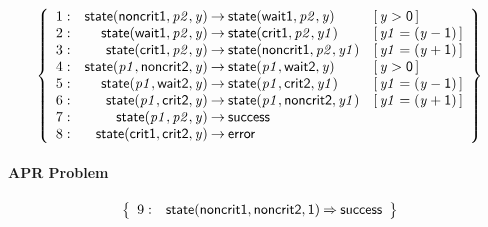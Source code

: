 \documentclass[a4paper]{article}
\newcommand{\symb}[1]{\mathsf{#1}}
\newcommand{\var}[1]{\mathit{#1}}
\newcommand{\Constraint}[1]{[\, #1 \,]}
\begin{document}
\[
\left\{
\begin{array}{rr@{\>}c@{\>}ll}
\mathrm{1} : 
 & \symb{state}(\symb{noncrit1},\var{p2},\var{y})
 & \to 
 & \symb{state}(\symb{wait1},\var{p2},\var{y})
 & \Constraint{\var{y} > \symb{0}}\\

\mathrm{2} : 
 & \symb{state}(\symb{wait1},\var{p2},\var{y})
 & \to 
 & \symb{state}(\symb{crit1},\var{p2},\var{y1})
 & \Constraint{\var{y1} = (\var{y} - \symb{1})}\\

\mathrm{3} : 
 & \symb{state}(\symb{crit1},\var{p2},\var{y})
 & \to 
 & \symb{state}(\symb{noncrit1},\var{p2},\var{y1})
 & \Constraint{\var{y1} = (\var{y} + \symb{1})}\\

\mathrm{4} : 
 & \symb{state}(\var{p1},\symb{noncrit2},\var{y})
 & \to 
 & \symb{state}(\var{p1},\symb{wait2},\var{y})
 & \Constraint{\var{y} > \symb{0}}\\

\mathrm{5} : 
 & \symb{state}(\var{p1},\symb{wait2},\var{y})
 & \to 
 & \symb{state}(\var{p1},\symb{crit2},\var{y1})
 & \Constraint{\var{y1} = (\var{y} - \symb{1})}\\

\mathrm{6} : 
 & \symb{state}(\var{p1},\symb{crit2},\var{y})
 & \to 
 & \symb{state}(\var{p1},\symb{noncrit2},\var{y1})
 & \Constraint{\var{y1} = (\var{y} + \symb{1})}\\

\mathrm{7} : 
 & \symb{state}(\var{p1},\var{p2},\var{y})
 & \to 
 & \symb{success}\\

\mathrm{8} : 
 & \symb{state}(\symb{crit1},\symb{crit2},\var{y})
 & \to 
 & \symb{error}\\

\end{array}
\right\}
\]


\paragraph{APR Problem}

\[
\left\{
\begin{array}{rr@{\>}c@{\>}ll}
\mathrm{9} : 
 & \symb{state}(\symb{noncrit1},\symb{noncrit2},\symb{1})
 & \Rightarrow 
 & \symb{success}\\

\end{array}
\right\}
\]
\end{document}
